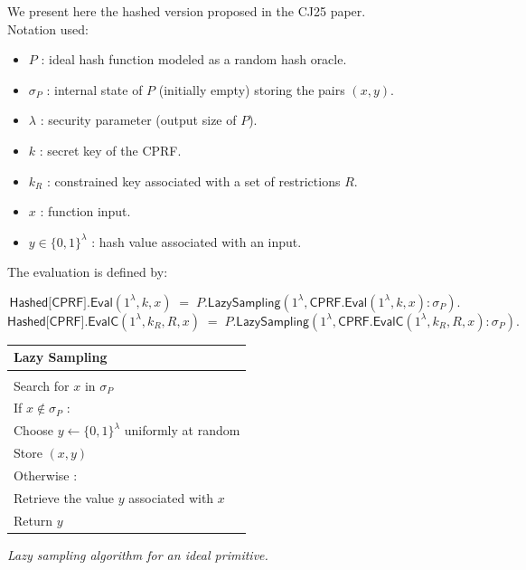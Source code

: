 \documentclass[9pt]{extarticle}
\begin{document}
We present here the hashed version proposed in the CJ25 paper.\\

Notation used:
\begin{itemize}
  \item $P$ : ideal hash function modeled as a random hash oracle.
  \item $\sigma_P$ : internal state of $P$ (initially empty) storing the pairs $(x,y)$.
  \item $\lambda$ : security parameter (output size of $P$).
  \item $k$ : secret key of the \textsf{CPRF}.
  \item $k_R$ : constrained key associated with a set of restrictions $R$.
  \item $x$ : function input.
  \item $y \in \{0,1\}^{\lambda}$ : hash value associated with an input.
\end{itemize}

The evaluation is defined by:

\[
\textsf{Hashed[CPRF].Eval}(1^\lambda, k, x)
\;=\;
\textsf{$P$.LazySampling}(1^\lambda, \textsf{CPRF.Eval}(1^\lambda, k, x) : \sigma_P).
\]
\[
\textsf{Hashed[CPRF].EvalC}(1^\lambda, k_R, R, x)
\;=\;
\textsf{$P$.LazySampling}(1^\lambda, \textsf{CPRF.EvalC}(1^\lambda, k_R, R, x) : \sigma_P).
\]


\begin{center}
  \begin{tabular}{l}
    \textbf{Lazy Sampling} \\
    \hline \\
    Search for $x$ in $\sigma_P$ \\
    If $x \notin \sigma_P$ : \\
    \quad Choose $y \leftarrow \{0,1\}^\lambda$ uniformly at random \\
    \quad Store $(x,y)$ \\
    Otherwise : \\
    \quad Retrieve the value $y$ associated with $x$ \\
    Return $y$
  \end{tabular}
  
  \vspace{1ex}
  \textit{Lazy sampling algorithm for an ideal primitive.}
\end{center}


\end{document}
